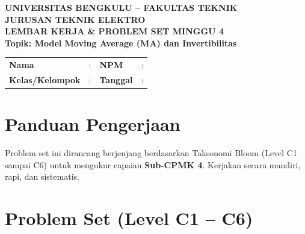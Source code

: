 \documentclass[11pt,a4paper]{article}
\begin{document}
\begin{center}
    {\large \textbf{\color{primaryblue}UNIVERSITAS BENGKULU -- FAKULTAS TEKNIK}}\\[0.1cm]
    {\large \textbf{\color{secondaryblue}JURUSAN TEKNIK ELEKTRO}}\\[0.25cm]
    {\LARGE \textbf{\color{primaryblue}LEMBAR KERJA \& PROBLEM SET MINGGU 4}}\\[0.1cm]
    {\normalsize \textbf{Topik: Model Moving Average (MA) dan Invertibilitas}}
\end{center}

\vspace{0.2cm}

\begin{tcolorbox}[colback=boxbg,colframe=primaryblue,arc=2mm,title=\textbf{Identitas Mahasiswa}]
\small
\begin{tabular}{p{2.5cm}p{5.5cm}p{2.5cm}p{4.5cm}}
\textbf{Nama} & : \dotfill & \textbf{NPM} & : \dotfill \\
\textbf{Kelas/Kelompok} & : \dotfill & \textbf{Tanggal} & : \dotfill \\
\end{tabular}
\end{tcolorbox}

\vspace{0.2cm}

\section{Panduan Pengerjaan}
Problem set ini dirancang berjenjang berdasarkan Taksonomi Bloom (Level C1 sampai C6) untuk mengukur capaian \textbf{Sub-CPMK 4}. Kerjakan secara mandiri, rapi, dan sistematis.

\section{Problem Set (Level C1 -- C6)}
\end{document}
